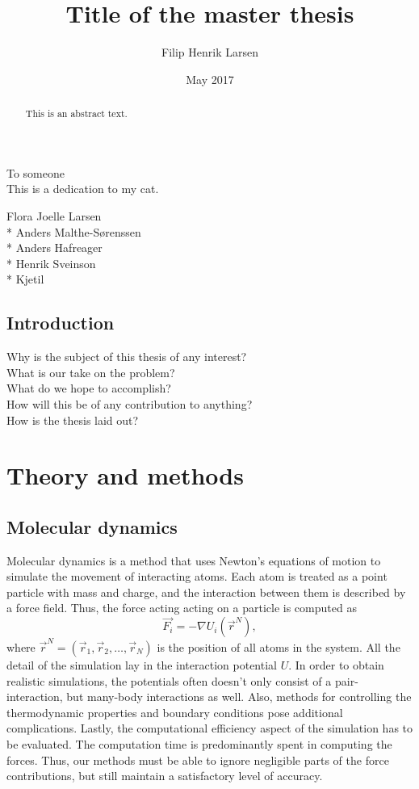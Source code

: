 \documentclass[twoside,english]{uiofysmaster}
\author{Filip Henrik Larsen}
\title{Title of the master thesis}
\date{May 2017}
\begin{document}
\maketitle

\begin{abstract}
This is an abstract text.
\end{abstract}

\begin{dedication}
  To someone
  \\\vspace{12pt}
  This is a dedication to my cat.
\end{dedication}

\begin{acknowledgements}
  Flora Joelle Larsen\\*
  Anders Malthe-Sørenssen \\*
  Anders Hafreager \\*
  Henrik Sveinson \\*
  Kjetil
\end{acknowledgements}
{
\hypersetup{linkcolor = black}
\tableofcontents
}
\chapter{Introduction}

Why is the subject of this thesis of any interest?\\
What is our take on the problem?\\
What do we hope to accomplish?\\
How will this be of any contribution to anything?\\
How is the thesis laid out?

\part{Theory and methods}
\chapter{Molecular dynamics}
Molecular dynamics is a method that uses Newton’s equations of motion to simulate the movement of interacting atoms. 
Each atom is treated as a point particle with mass and charge, and the interaction between them is described by a force field. 
Thus, the force acting acting on a particle is computed as
\begin{equation}
	\vec{F_i} = -\nabla U_i(\vec{r}^N), \label{MDForce}
\end{equation} 
where $\vec{r}^N=(\vec{r}_1, \vec{r}_2, \dots, \vec{r}_N)$ is the position of all atoms in the system. 
All the detail of the simulation lay in the interaction potential $U$.
In order to obtain realistic simulations, the potentials often doesn't only consist of a pair-interaction, but many-body interactions as well.
Also, methods for controlling the thermodynamic properties and boundary conditions pose additional complications.
Lastly, the computational efficiency aspect of the simulation has to be evaluated. 
The computation time is predominantly spent in computing the forces. 
Thus, our methods must be able to ignore negligible parts of the force contributions, but still maintain a satisfactory level of accuracy. 
\end{document}
